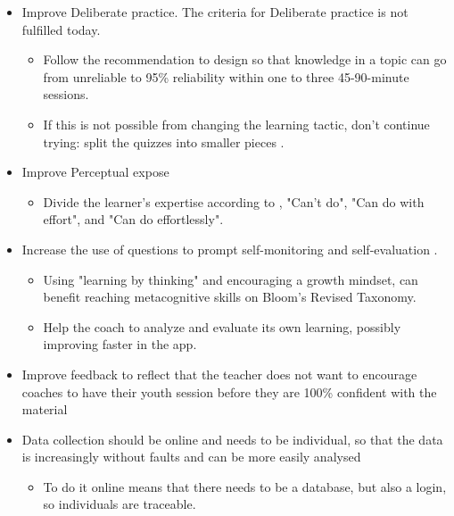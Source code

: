   \begin{itemize}
    \item Improve Deliberate practice. The criteria for Deliberate practice is not fulfilled today.
    \begin{itemize}
      \item  Follow the recommendation to design so that knowledge in a topic can go from unreliable to 95\% reliability within one to three 45-90-minute sessions.
      \item If this is not possible from changing the learning tactic, don't continue trying: split the quizzes into smaller pieces \citep{sierra}.
    \end{itemize}
    \item Improve Perceptual expose
    \begin{itemize}
      \item Divide the learner's expertise according to \cite{sierra}, "Can't do", "Can do with effort", and "Can do effortlessly".
    \end{itemize}
    \item Increase the use of questions to prompt self-monitoring  and self-evaluation \citep{sitzmann}.
    \begin{itemize}
      \item Using "learning by thinking" and encouraging a growth mindset, can benefit reaching metacognitive skills on Bloom's Revised Taxonomy.
      \item Help the coach to analyze and evaluate its own learning, possibly improving faster in the app.
    \end{itemize}
    \item Improve feedback to reflect that the teacher does not want to encourage coaches to have their youth session before they are 100\% confident with the material
    \item Data collection should be online and needs to be individual, so that the data is increasingly without faults and can be more easily analysed
    \begin{itemize}
      \item To do it online means that there needs to be a database, but also a login, so individuals are traceable.
    \end{itemize}
  \end{itemize}
